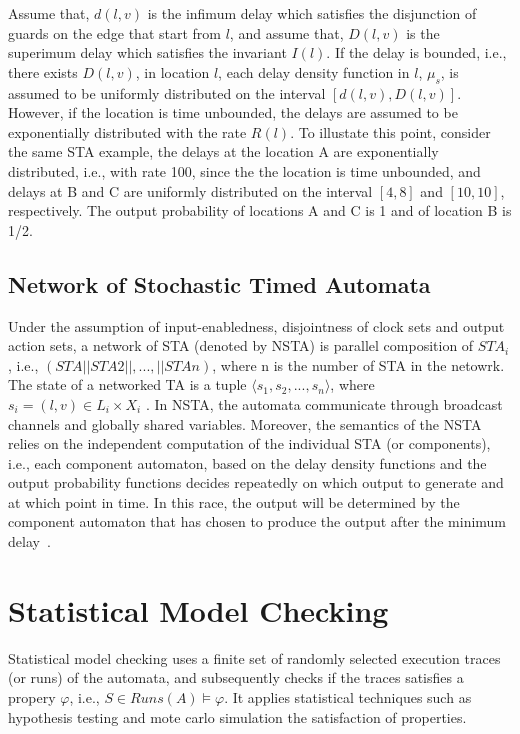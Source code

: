 Assume that, $d(l,v)$ is the infimum delay which satisfies the disjunction of guards on the edge that start from $l$, and assume that, $D(l,v)$ is the superimum delay which satisfies the invariant $I(l)$. If the delay is bounded, i.e., there exists $D(l,v)$, in location $l$, each delay density function in $l$, $\mu_s$, is assumed to be uniformly distributed on the interval $[d(l,v),D(l,v)]$. However, if the location is time unbounded, the delays are assumed to be exponentially distributed with the rate $R(l)$. To illustate this point, consider the same STA example, the delays at the location A are exponentially distributed, i.e., with rate 100, since the the location is time unbounded, and delays at B and C are uniformly distributed on the interval $[4,8]$ and $[10,10]$, respectively. The output probability of locations A and C is 1 and of location B is 1/2. 

\subsection*{Network of Stochastic Timed Automata}
Under the assumption of input-enabledness, disjointness of clock sets and output action sets, a network of STA (denoted by NSTA) is parallel composition of $STA_i$, i.e., $(STA||STA2||,...,||STAn)$, where n is the number of STA in the netowrk.  The state of a networked TA is a tuple $\langle s_1,s_2,...,s_n\rangle$, where $s_i=(l,v)\in L_i\times X_i$ . In NSTA, the automata communicate through broadcast channels and globally shared variables. Moreover, the semantics of the NSTA relies on the independent computation of the individual STA (or components), i.e.,  each component automaton, based on the delay density functions and the output probability functions decides repeatedly on which output to generate and at which point in time. In this race, the output will be determined by the component automaton that has chosen to produce the output after the minimum delay~\cite{David2011StatisticalAutomata}.


\section{Statistical Model Checking}
Statistical model checking uses a finite set of randomly selected execution traces (or runs) of the automata, and subsequently checks if the traces satisfies a propery $\varphi$, i.e., $S\in Runs(A)\models \varphi$. It applies statistical techniques such as hypothesis testing and mote carlo simulation the satisfaction of properties. 

